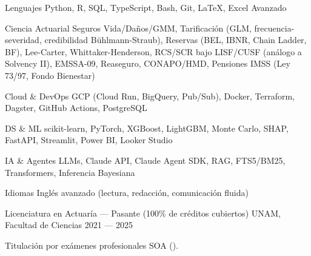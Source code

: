 \documentclass[10pt, letterpaper]{awesome-cv}
\begin{document}
\begin{cvskills}
  \cvskill
    {Lenguajes}
    {Python, R, SQL, TypeScript, Bash, Git, \LaTeX, Excel Avanzado}

  \cvskill
    {Ciencia Actuarial}
    {Seguros Vida/Daños/GMM, Tarificación (GLM, frecuencia-severidad, credibilidad Bühlmann-Straub), Reservas (BEL, IBNR, Chain Ladder, BF), Lee-Carter, Whittaker-Henderson, RCS/SCR bajo LISF/CUSF (análogo a Solvency II), EMSSA-09, Reaseguro, CONAPO/HMD, Pensiones IMSS (Ley 73/97, Fondo Bienestar)}

  \cvskill
    {Cloud \& DevOps}
    {GCP (Cloud Run, BigQuery, Pub/Sub), Docker, Terraform, Dagster, GitHub Actions, PostgreSQL}

  \cvskill
    {DS \& ML}
    {scikit-learn, PyTorch, XGBoost, LightGBM, Monte Carlo, SHAP, FastAPI, Streamlit, Power BI, Looker Studio}

  \cvskill
    {IA \& Agentes}
    {LLMs, Claude API, Claude Agent SDK, RAG, FTS5/BM25, Transformers, Inferencia Bayesiana}

  \cvskill
    {Idiomas}
    {Inglés avanzado (lectura, redacción, comunicación fluida)}
\end{cvskills}


\begin{cventries}
  \cventry
    {Licenciatura en Actuaría — Pasante (100\% de créditos cubiertos)}
    {UNAM, Facultad de Ciencias}
    {}
    {2021 — 2025}
    {
      \begin{cvitems}
        \item {Titulación por exámenes profesionales SOA ().}
      \end{cvitems}
    }
\end{cventries}

\end{document}
